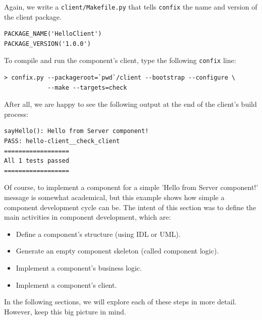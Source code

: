 \noindent
Again, we write a {\tt client/Makefile.py} that tells {\tt confix} the
name and version of the client package.
\begin{small}
\begin{verbatim}
PACKAGE_NAME('HelloClient')
PACKAGE_VERSION('1.0.0')
\end{verbatim}
\end{small}

\noindent
To compile and run the component's client, type the following {\tt confix}
line: 
\begin{small}
\begin{verbatim}
> confix.py --packageroot=`pwd`/client --bootstrap --configure \
            --make --targets=check
\end{verbatim}
\end{small}

\noindent
After all, we are happy to see the following output at the end of the client's
build process:

\begin{small}
\begin{verbatim}
sayHello(): Hello from Server component!
PASS: hello-client__check_client
==================
All 1 tests passed
==================
\end{verbatim}
\end{small}

\noindent
Of course, to implement a component for a simple 'Hello from Server component!'
message is somewhat academical, but this example shows how simple a component
development cycle can be. 
The intent of this section was to define the main activities in component 
development, which are:
\begin{itemize}
\item Define a component's structure (using IDL or UML).
\item Generate an empty component skeleton (called component logic).
\item Implement a component's business logic. 
\item Implement a component's client.
\end{itemize}

\noindent
In the following sections, we will explore each of these steps in more
detail. However, keep this big picture in mind. 

